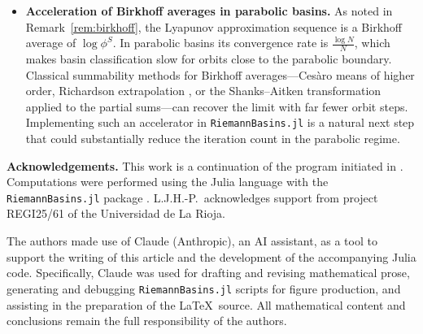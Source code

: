 \documentclass[12pt]{article}
\theoremstyle{definition}
\begin{document}
\begin{itemize}
  \item \textbf{Acceleration of Birkhoff averages in parabolic basins.}
        As noted in Remark~\ref{rem:birkhoff}, the Lyapunov approximation
        sequence is a Birkhoff average of $\log\phi^S$.  In parabolic
        basins its convergence rate is $\tfrac{\log N}{N}$, which makes
        basin classification slow for orbits close to the parabolic
        boundary.  Classical summability methods for Birkhoff
        averages---Cesàro means of higher order, Richardson extrapolation \cite{Richardson1911},
        or the Shanks--Aitken transformation \cite{Shanks1955} applied to the partial
        sums---can recover the limit with far fewer orbit steps.
        Implementing such an accelerator in \texttt{RiemannBasins.jl}
        is a natural next step that could substantially reduce the
        iteration count in the parabolic regime.
\end{itemize}

\bigskip
\noindent\textbf{Acknowledgements.}
This work is a continuation of the program initiated in
\cite{Extremiana2019,Alvarez2023}.  Computations were performed using
the Julia language \cite{Julia2017} with the \texttt{RiemannBasins.jl}
package \cite{RiemannBasins}.
L.J.H.-P.\ acknowledges support from project REGI25/61 of the
Universidad de La Rioja.

The authors made use of Claude (Anthropic), an AI assistant, as a tool
to support the writing of this article and the development of the
accompanying Julia code.  Specifically, Claude was used for drafting and
revising mathematical prose, generating and debugging
\texttt{RiemannBasins.jl} scripts for figure production, and assisting
in the preparation of the \LaTeX\ source.  All mathematical content and
conclusions remain the full responsibility of the authors.



\end{document}
